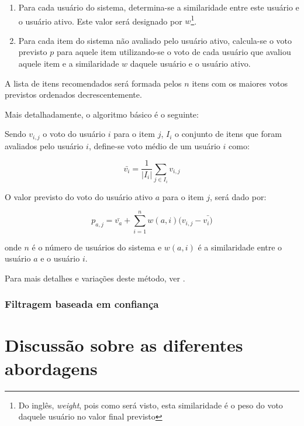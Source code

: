 \begin{enumerate}
\item 
Para cada usuário do sistema, determina-se a similaridade entre este usuário e o usuário ativo. Este valor será designado por $w$\footnote{Do inglês, \textit{weight}, pois como será visto, esta similaridade é o peso do voto daquele usuário no valor final previsto}.

\item Para cada item do sistema não avaliado pelo usuário ativo, calcula-se o voto previsto $p$ para aquele item utilizando-se o voto de cada usuário que avaliou aquele item e a similaridade $w$ daquele usuário e o usuário ativo.
\end{enumerate}

A lista de itens recomendados será formada pelos $n$ itens com os maiores votos previstos ordenados decrescentemente.

Mais detalhadamente, o algoritmo básico é o seguinte:

Sendo $v_{i,j}$ o voto do usuário $i$ para o item $j$, $I_{i}$ o conjunto de itens que foram avaliados pelo usuário $i$, define-se voto médio de um usuário $i$ como:

\begin{equation}
 \bar{v_{i}} = \frac{1}{|I_{i}|} \sum_{j \in I_{i}} v_{i,j}
\end{equation}

O valor previsto do voto do usuário ativo $a$ para o item $j$, será dado por:

\begin{equation}
 p_{a,j} = \bar{v_{a}} + \sum_{i=1}^n{w(a,i) (v_{i,j} - \bar{v_{i})}}
\end{equation}

onde $n$ é o número de usuários do sistema e $w(a,i)$ é a similaridade entre o usuário $a$ e o usuário $i$.

Para mais detalhes e variações deste método, ver \cite{Breese98}.


\subsubsection{Filtragem baseada em confiança} %

\section{Discussão sobre as diferentes abordagens}

